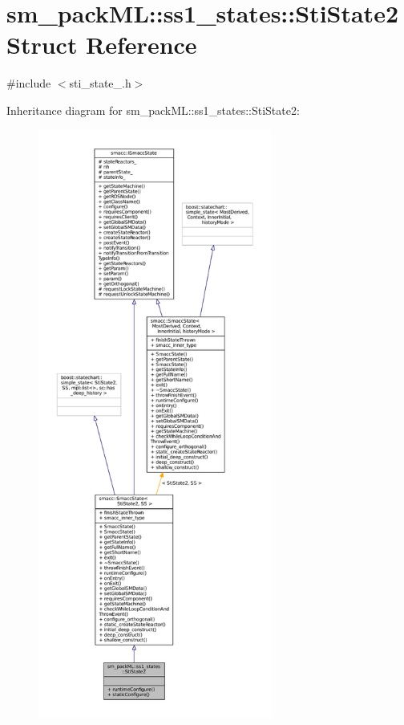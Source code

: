 \hypertarget{structsm__packML_1_1ss1__states_1_1StiState2}{}\section{sm\+\_\+pack\+ML\+:\+:ss1\+\_\+states\+:\+:Sti\+State2 Struct Reference}
\label{structsm__packML_1_1ss1__states_1_1StiState2}


{\ttfamily \#include $<$sti\+\_\+state\+\_.\+h$>$}



Inheritance diagram for sm\+\_\+pack\+ML\+:\+:ss1\+\_\+states\+:\+:Sti\+State2\+:
\nopagebreak
\begin{figure}[H]
\begin{center}
\leavevmode
\includegraphics[height=550pt]{structsm__packML_1_1ss1__states_1_1StiState2__inherit__graph}
\end{center}
\end{figure}


